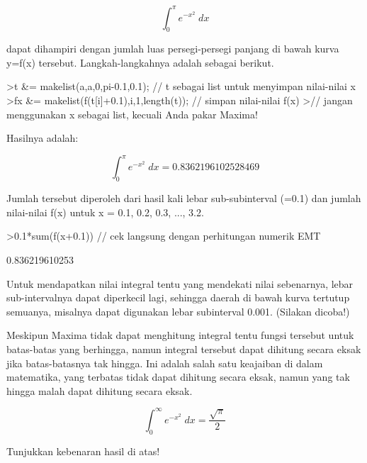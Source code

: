 \documentclass[a4paper,10pt]{article}
\begin{document}
\begin{eulernotebook}
\begin{eulercomment}
\begin{eulercomment}
\begin{eulercomment}
\begin{eulercomment}
\begin{eulercomment}
\end{eulercomment}
\begin{eulerformula}
\[
\int_{0}^{\pi}{e^ {- x^2 }\;dx}
\]
\end{eulerformula}
\begin{eulercomment}
dapat dihampiri dengan jumlah luas persegi-persegi panjang di bawah
kurva y=f(x) tersebut. Langkah-langkahnya adalah sebagai berikut.
\end{eulercomment}
\begin{eulerprompt}
>t &= makelist(a,a,0,pi-0.1,0.1); // t sebagai list untuk menyimpan nilai-nilai x
>fx &= makelist(f(t[i]+0.1),i,1,length(t)); // simpan nilai-nilai f(x)
>// jangan menggunakan x sebagai list, kecuali Anda pakar Maxima!
\end{eulerprompt}
\begin{eulercomment}
Hasilnya adalah:

\end{eulercomment}
\begin{eulerformula}
\[
\int_{0}^{\pi}{e^ {- x^2 }\;dx}=0.8362196102528469
\]
\end{eulerformula}
\begin{eulercomment}
Jumlah tersebut diperoleh dari hasil kali lebar sub-subinterval (=0.1)
dan jumlah nilai-nilai f(x) untuk x = 0.1, 0.2, 0.3, ..., 3.2.
\end{eulercomment}
\begin{eulerprompt}
>0.1*sum(f(x+0.1)) // cek langsung dengan perhitungan numerik EMT
\end{eulerprompt}
\begin{euleroutput}
  0.836219610253
\end{euleroutput}
\begin{eulercomment}
Untuk mendapatkan nilai integral tentu yang mendekati nilai
sebenarnya, lebar sub-intervalnya dapat diperkecil lagi, sehingga
daerah di bawah kurva tertutup semuanya, misalnya dapat digunakan
lebar subinterval 0.001. (Silakan dicoba!)

Meskipun Maxima tidak dapat menghitung integral tentu fungsi tersebut
untuk batas-batas yang berhingga, namun integral tersebut dapat
dihitung secara eksak jika batas-batasnya tak hingga. Ini adalah salah
satu keajaiban di dalam matematika, yang terbatas tidak dapat dihitung
secara eksak, namun yang tak hingga malah dapat dihitung secara eksak.
\end{eulercomment}
\begin{eulerformula}
\[
\int_{0}^{\infty }{e^ {- x^2 }\;dx}=\frac{\sqrt{\pi}}{2}
\]
\end{eulerformula}
\begin{eulercomment}
Tunjukkan kebenaran hasil di atas!


\end{eulercomment}
\end{eulercomment}
\end{eulercomment}
\end{eulercomment}
\end{eulercomment}
\end{eulernotebook}
\end{document}
